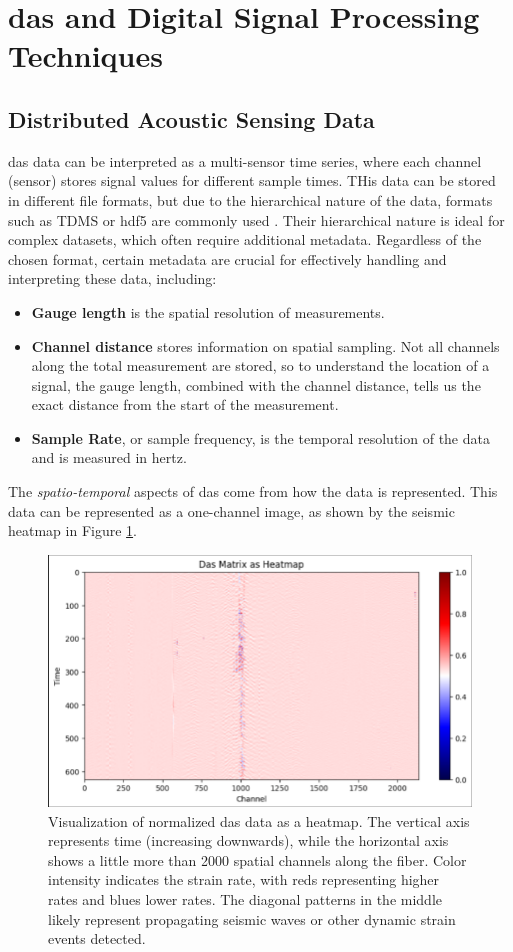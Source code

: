 \section{\acrshort{das} and Digital Signal Processing Techniques}
\label{back:dsp}

\subsection{Distributed Acoustic Sensing Data}
\label{back:das}

\acrshort{das} data can be interpreted as a multi-sensor time series, where each channel (sensor) stores signal values for different sample times. THis data can be stored in different file formats, but due to the hierarchical nature of the data, formats such as TDMS \cite{10.1145/800196.805973} or \acrshort{hdf5} \cite{koranne2011hierarchical} are commonly used \cite{spica2022pubdas}. Their hierarchical nature is ideal for complex datasets, which often require additional metadata. Regardless of the chosen format, certain metadata are crucial for effectively handling and interpreting these data, including:
\begin{itemize}
    \item \textbf{Gauge length} is the spatial resolution of measurements.
    \item \textbf{Channel distance} stores information on spatial sampling. Not all channels along the total measurement are stored, so to understand the location of a signal, the gauge length, combined with the channel distance, tells us the exact distance from the start of the measurement.
    \item \textbf{Sample Rate}, or sample frequency, is the temporal resolution of the data and is measured in hertz. 
\end{itemize}
%
The \textit{spatio-temporal} aspects of \acrshort{das} come from how the data is represented. This data can be represented as a one-channel image, as shown by the seismic heatmap in Figure \ref{fig:dasframe-ex}. 
%
\begin{figure}[!h]
    \centering
    \includegraphics[width=0.7\linewidth]{figures/das_example.png}
    \caption{Visualization of normalized \acrshort{das} data as a heatmap. The vertical axis represents time (increasing downwards), while the horizontal axis shows a little more than 2000 spatial channels along the fiber. Color intensity indicates the strain rate, with reds representing higher rates and blues lower rates. The diagonal patterns in the middle likely represent propagating seismic waves or other dynamic strain events detected.}
    \label{fig:dasframe-ex}
\end{figure}
%

